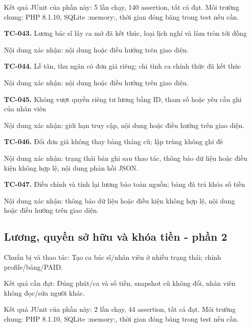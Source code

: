 Kết quả JUnit của phần này:\allowbreak{} 5 lần chạy, 140 assertion, tất cả đạt.\allowbreak{} Môi trường chung:\allowbreak{} PHP 8.\allowbreak{}1.\allowbreak{}10, SQLite :\allowbreak{}memory:\allowbreak{}, thời gian đóng băng trong test nếu cần.\allowbreak{}

\noindent\textbf{TC-043.} Lương bác sĩ lấy ca mở đã kết thúc, loại lịch nghỉ và làm tròn tới đồng\par
Nội dung xác nhận:\allowbreak{} nội dung hoặc điều hướng trên giao diện.\allowbreak{}

\noindent\textbf{TC-044.} Lễ tân, thu ngân có đơn giá riêng; chỉ tính ca chính thức đã kết thúc\par
Nội dung xác nhận:\allowbreak{} nội dung hoặc điều hướng trên giao diện.\allowbreak{}

\noindent\textbf{TC-045.} Không vượt quyền riêng tư lương bằng ID, tham số hoặc yêu cầu ghi của nhân viên\par
Nội dung xác nhận:\allowbreak{} giới hạn truy cập, nội dung hoặc điều hướng trên giao diện.\allowbreak{}

\noindent\textbf{TC-046.} Đổi đơn giá không thay bảng tháng cũ; lập trùng không ghi đè\par
Nội dung xác nhận:\allowbreak{} trạng thái bản ghi sau thao tác, thông báo dữ liệu hoặc điều kiện không hợp lệ, nội dung phản hồi JSON.\allowbreak{}

\noindent\textbf{TC-047.} Điều chỉnh và tính lại lương bảo toàn nguồn; bảng đã trả khóa số tiền\par
Nội dung xác nhận:\allowbreak{} thông báo dữ liệu hoặc điều kiện không hợp lệ, nội dung hoặc điều hướng trên giao diện.\allowbreak{}


\par\vspace{8pt}

\subsection{Lương, quyền sở hữu và khóa tiền - phần 2}
Chuẩn bị và thao tác:\allowbreak{} Tạo ca bác sĩ/\allowbreak{}nhân viên ở nhiều trạng thái; chỉnh profile/\allowbreak{}bảng/\allowbreak{}PAID.\allowbreak{}

Kết quả cần đạt:\allowbreak{} Đúng phút/\allowbreak{}ca và số tiền, snapshot cũ không đổi, nhân viên không đọc/\allowbreak{}sửa người khác.\allowbreak{}

Kết quả JUnit của phần này:\allowbreak{} 2 lần chạy, 44 assertion, tất cả đạt.\allowbreak{} Môi trường chung:\allowbreak{} PHP 8.\allowbreak{}1.\allowbreak{}10, SQLite :\allowbreak{}memory:\allowbreak{}, thời gian đóng băng trong test nếu cần.\allowbreak{}

